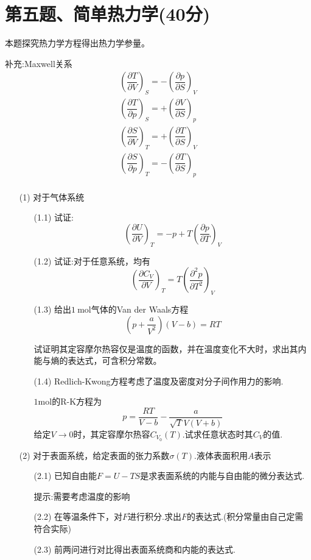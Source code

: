 \documentclass{article}
\begin{document}
\section*{第五题、简单热力学(40分)}
本题探究热力学方程得出热力学参量。\par
补充:Maxwell关系
$$
\begin{aligned}
\left( \dfrac{\partial T}{\partial V}\right) _{S}=-\left( \dfrac{\partial p}{\partial S}\right) _{V}\\
\left( \dfrac{\partial T}{\partial p}\right) _{S}=+\left( \dfrac{\partial V}{\partial S}\right) _{p}\\
\left( \dfrac{\partial S}{\partial V}\right) _{T}=+\left( \dfrac{\partial T}{\partial S}\right) _{V}\\
\left( \dfrac{\partial S}{\partial p}\right) _{T}=-\left( \dfrac{\partial T}{\partial S}\right) _{p}\\
\end{aligned}
$$
\begin{itemize}
    \item[(1)]对于气体系统
    \begin{itemize}
        \item[(1.1)]试证:$$\left(\dfrac{\partial U}{\partial V}\right)_T=-p+T \left(\dfrac{\partial p}{\partial T}\right)_V$$
        \item[(1.2)]试证:对于任意系统，均有$$\left(\dfrac{\partial C_V}{\partial V} \right)_T=T\left(\dfrac{\partial^2 p}{\partial T^2}\right)_V$$
        \item[(1.3)]给出$1\ \mathrm{mol}$气体的Van der Waals方程$$\left(p+\dfrac{a}{V^2}\right)(V-b)=RT$$\par
        试证明其定容摩尔热容仅是温度的函数，并在温度变化不大时，求出其内能与熵的表达式，可含积分常数。
        \item[(1.4)]Redlich-Kwong方程考虑了温度及密度对分子间作用力的影响.\par
        $1\mathrm{mol}$的R-K方程为$$p=\dfrac{RT}{V-b}-\dfrac{a}{\sqrt{T} V(V+b)}$$
        给定$V\to 0$时，其定容摩尔热容$C_{V_0}(T)$.试求任意状态时其$C_V$的值.
    \end{itemize}
    \item[(2)] 对于表面系统，给定表面的张力系数$\sigma(T)$.液体表面积用$A$表示
    \begin{itemize}
        \item[(2.1)] 已知自由能$F=U-TS$是求表面系统的内能与自由能的微分表达式.\par 提示:需要考虑温度的影响
        \item[(2.2)] 在等温条件下，对$F$进行积分.求出$F$的表达式.(积分常量由自己定需符合实际)
        \item[(2.3)] 前两问进行对比得出表面系统商和内能的表达式.
    \end{itemize}
\end{itemize}
\end{document}
